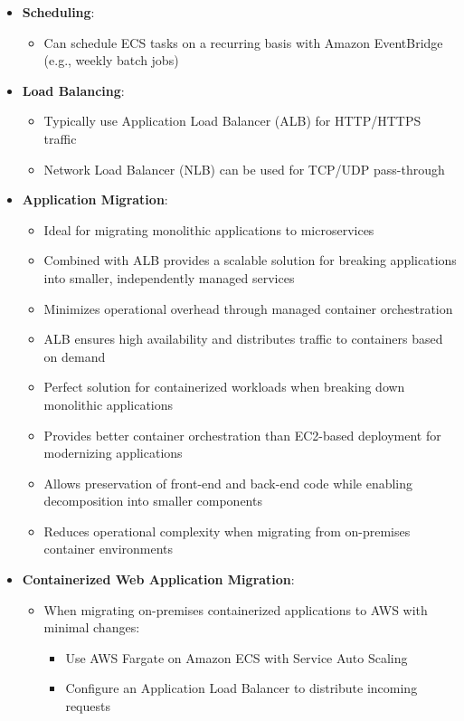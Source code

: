 \documentclass[11pt,a4paper]{report}
\begin{document}
\begin{itemize}
\begin{itemize}
\begin{itemize}
\end{itemize}
\end{itemize}
  \item \textbf{Scheduling}:
\begin{itemize}
  \item Can schedule ECS tasks on a recurring basis with Amazon EventBridge (e.g., weekly batch jobs)
\end{itemize}
  \item \textbf{Load Balancing}:
\begin{itemize}
  \item Typically use Application Load Balancer (ALB) for HTTP/HTTPS traffic
  \item Network Load Balancer (NLB) can be used for TCP/UDP pass-through
\end{itemize}
  \item \textbf{Application Migration}:
\begin{itemize}
  \item Ideal for migrating monolithic applications to microservices
  \item Combined with ALB provides a scalable solution for breaking applications into smaller, independently managed services
  \item Minimizes operational overhead through managed container orchestration
  \item ALB ensures high availability and distributes traffic to containers based on demand
  \item Perfect solution for containerized workloads when breaking down monolithic applications
  \item Provides better container orchestration than EC2-based deployment for modernizing applications
  \item Allows preservation of front-end and back-end code while enabling decomposition into smaller components
  \item Reduces operational complexity when migrating from on-premises container environments
\end{itemize}
  \item \textbf{Containerized Web Application Migration}:
\begin{itemize}
  \item When migrating on-premises containerized applications to AWS with minimal changes:
\begin{itemize}
  \item Use AWS Fargate on Amazon ECS with Service Auto Scaling
  \item Configure an Application Load Balancer to distribute incoming requests

\end{itemize}
\end{itemize}
\end{itemize}
\end{document}
